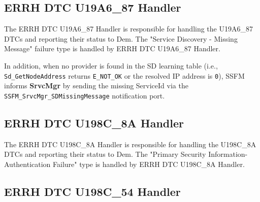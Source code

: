 
{     }

\subsection{ERRH DTC U19A6_87 Handler}
\label{subsec:ERRHDTCU19A687}

The ERRH DTC U19A6_87 Handler is responsible for handling the U19A6_87 DTCs and reporting their status to Dem.
The "Service Discovery - Missing Message" failure type is handled by ERRH DTC U19A6_87 Handler. 

In addition, when no provider is found in the SD learning table (i.e., \texttt{Sd\_GetNodeAddress} returns \texttt{E\_NOT\_OK} or the resolved IP address is \texttt{0}), 
SSFM informs \textbf{SrvcMgr} by sending the missing ServiceId via the \texttt{SSFM\_SrvcMgr\_SDMissingMessage} notification port.


{  }

\subsection{ERRH DTC U198C_8A Handler}
\label{subsec:ERRHDTCU198C8A}

The ERRH DTC U198C_8A Handler is responsible for handling the U198C_8A DTCs and reporting their status to Dem.
The "Primary Security Information-Authentication Failure" type is handled by ERRH DTC U198C_8A Handler. 


{ }

\subsection{ERRH DTC U198C_54 Handler}
\label{subsec:ERRHDTCU198C54}


